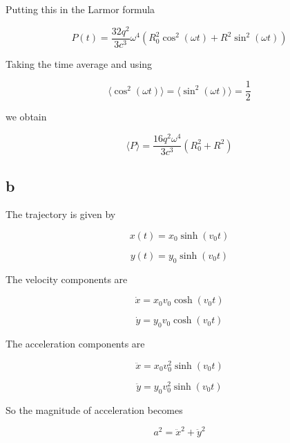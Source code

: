 \documentclass{article}
\begin{document}
Putting this in the Larmor formula

\begin{equation}
\boxed{
P(t)=
\frac{32q^2}{3c^3}
\omega^4
\left(
R_0^2\cos^2(\omega t)+R^2\sin^2(\omega t)
\right)
}
\end{equation}

Taking the time average and using

\begin{equation}
\langle \cos^2(\omega t) \rangle =
\langle \sin^2(\omega t) \rangle = \frac12
\end{equation}

we obtain

\begin{equation}
\boxed{
\langle P \rangle =
\frac{16q^2\omega^4}{3c^3}(R_0^2+R^2)
}
\end{equation}

\subsection{b}

The trajectory is given by

\begin{equation}
x(t)=x_0\sinh(v_0 t)
\end{equation}

\begin{equation}
y(t)=y_0\sinh(v_0 t)
\end{equation}

The velocity components are

\begin{equation}
\dot{x}=x_0 v_0\cosh(v_0 t)
\end{equation}

\begin{equation}
\dot{y}=y_0 v_0\cosh(v_0 t)
\end{equation}

The acceleration components are

\begin{equation}
\ddot{x}=x_0 v_0^2\sinh(v_0 t)
\end{equation}

\begin{equation}
\ddot{y}=y_0 v_0^2\sinh(v_0 t)
\end{equation}

So the magnitude of acceleration becomes

\begin{equation}
a^2=\ddot{x}^2+\ddot{y}^2
\end{equation}
\end{document}
